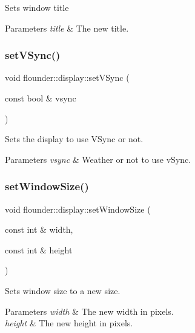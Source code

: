 Sets window title 


\begin{DoxyParams}{Parameters}
{\em title} & The new title. \\
\hline
\end{DoxyParams}
\mbox{\label{classflounder_1_1display_a172501e1e99cde228d86fab59a3a636b}} 
\subsubsection{\texorpdfstring{set\+V\+Sync()}{setVSync()}}
{\footnotesize\ttfamily void flounder\+::display\+::set\+V\+Sync (\begin{DoxyParamCaption}\item[{const bool \&}]{vsync }\end{DoxyParamCaption})}



Sets the display to use V\+Sync or not. 


\begin{DoxyParams}{Parameters}
{\em vsync} & Weather or not to use v\+Sync. \\
\hline
\end{DoxyParams}
\mbox{\label{classflounder_1_1display_a13edcfe35505b3e164010ed1b232e5d1}} 
\subsubsection{\texorpdfstring{set\+Window\+Size()}{setWindowSize()}}
{\footnotesize\ttfamily void flounder\+::display\+::set\+Window\+Size (\begin{DoxyParamCaption}\item[{const int \&}]{width,  }\item[{const int \&}]{height }\end{DoxyParamCaption})}



Sets window size to a new size. 


\begin{DoxyParams}{Parameters}
{\em width} & The new width in pixels. \\
\hline
{\em height} & The new height in pixels. \\
\hline
\end{DoxyParams}
\mbox{\label{classflounder_1_1display_a799c6a76fcac1a0ca56dfd6b8d7993fa}} 
